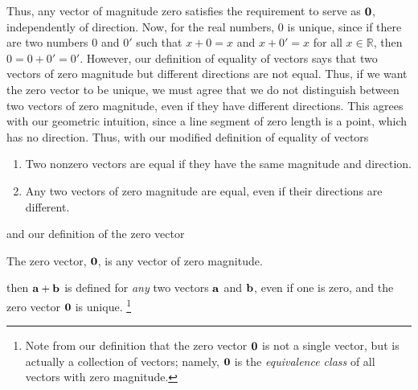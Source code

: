 \documentclass[12pt,letterpaper,reqno]{article}
\numberwithin{equation}{section}
\newcommand{\ti}[1]{\textit{#1}}
\begin{document}
Thus, any vector of magnitude zero satisfies the requirement to serve as ${\bf 0}$, independently of direction. Now, for the real numbers, $0$ is unique, since if there are two numbers $0$ and $0'$ such that $x+0=x$ and $x+0'=x$ for all $x \in \mathbb{R}$, then $0=0+0'=0'$. However, our definition of equality of vectors says that two vectors of zero magnitude but different directions are not equal. Thus, if we want the zero vector to be unique, we must agree that we do not distinguish between two vectors of zero magnitude, even if they have different directions. This agrees with our geometric intuition, since a line segment of zero length is a point, which has no direction. Thus, with our modified definition of equality of vectors 

\begin{defn}
\begin{enumerate}[(1)] \hspace{10cm}
	\item Two nonzero vectors are equal if they have the same magnitude and direction.
	\item Any two vectors of zero magnitude are equal, even if their directions are different.
\end{enumerate}	
\end{defn}
and our definition of the zero vector
\begin{defn}
	The zero vector, ${\bf 0}$, is any vector of zero magnitude.
\end{defn}
then ${\bf a}+{\bf b}$ is defined for \ti{any} two vectors ${\bf a}$ and ${\bf b}$, even if one is zero, and the zero vector ${\bf 0}$ is unique. \footnote{Note from our definition that the zero vector ${\bf 0}$ is not a single vector, but is actually a collection of vectors; namely, ${\bf 0}$ is the \ti{equivalence class} of all vectors with zero magnitude.}
\end{document}

